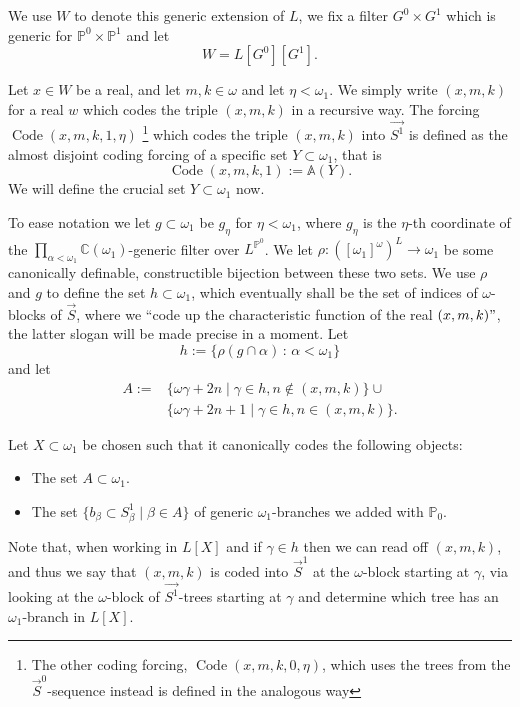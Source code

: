 \documentclass[a4paper,11pt]{article}
\newcommand{\forceP}{\mathbb{P}}
\begin{document}
 We use $W$ to denote this generic extension of $L$, we fix a filter $G^0 \times G^1$ which is generic for $\forceP^0 \times \forceP^1$  and let \[W=L[G^0][G^1]. \] 

 Let $x \in W$ be a real,  and let $m,k \in \omega$ and let $\eta <\omega_1$. We simply write $(x,m,k)$ for a real $w$ which codes the triple $(x,m,k)$ in a recursive way. The forcing $\operatorname{Code}(x,m,k,1,\eta)$ \footnote{The other coding forcing,  $\operatorname{Code}(x,m,k,0,\eta)$, which uses the trees from the $\vec{S}^0$-sequence instead is defined in the analogous way}  which codes the triple $(x,m,k)$ into $\vec{S^1}$ is defined as the almost disjoint coding forcing of a specific set $Y \subset \omega_1$, that is
 \[ \operatorname{Code}(x,m,k,1) := {\mathbb{A}}({Y}).\]  We will define the crucial set $Y \subset \omega_1$ now.
 

 To ease notation we let $g \subset \omega_1$ be $g_{\eta}$ for $\eta < \omega_1$, where $g_{\eta}$ is the $\eta$-th coordinate of the $\prod_{\alpha < \omega_1} \mathbb{C}(\omega_1)$-generic filter over $L^{\forceP^0}$. We let $\rho: ([\omega_1]^{\omega})^{L} \rightarrow \omega_1$ be some canonically definable, constructible bijection between
these two sets. We use $\rho$ and $g$ to define the set $h \subset \omega_1$, which eventually shall be the set of indices of $\omega$-blocks of $\vec{S}$, where we ``code up the characteristic function of the real $(x,m,k)"$, the latter slogan will be made precise in a moment. Let \[h:= \{\rho( g \cap \alpha) \,: \, \alpha < \omega_1 \}\] and let
\begin{align*}
A:= &\{ \omega \gamma +2n \mid \gamma \in h, n \notin (x,m,k) \} \cup \\& \{\omega \gamma + 2n+1 \mid \gamma \in h, n \in (x,m,k) \}.
\end{align*}




Let $X \subset \omega_1$ be chosen such that it canonically codes the following objects:
\begin{itemize}
\item The set $A \subset \omega_1$.
\item The set $\{ b_{\beta} \subset S^1_{\beta} \mid \beta \in A \}$ of generic $\omega_1$-branches we added with $\forceP_0$. 

\end{itemize}

Note that, when working in $L[X]$ and if $\gamma \in h$ then
 we can read off $(x,m,k)$, and thus  we say that $(x,m,k)$ is coded into $\vec{S}^1$ at the $\omega$-block starting at $\gamma$,  via looking at the $\omega$-block of $\vec{S^1}$-trees starting at $\gamma$ and determine which tree has an $\omega_1$-branch in $L[X]$.
\end{document}
